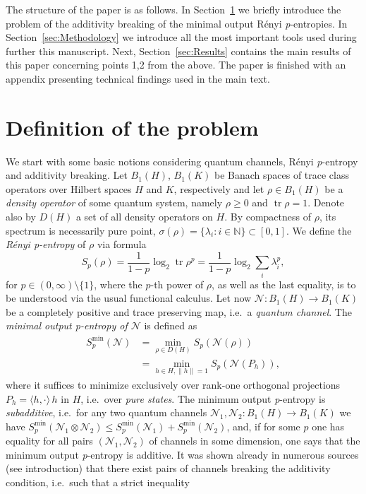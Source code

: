 \documentclass[reqno]{amsart}
\theoremstyle{plain}
\theoremstyle{note}
\newcommand{\naturals}{\mathbb{N}}
\newcommand\tr{\operatorname{tr}}
\newcommand{\proj}[1]{P_{#1}}
\newcommand{\iprod}[2]{\langle #1 , #2 \rangle}
\begin{document}
The structure of the paper is as follows. In Section~\ref{sec:DefOfProblem} we briefly introduce the problem of the additivity breaking of the minimal output R\'{e}nyi \textit{p}-entropies. In Section~\ref{sec:Methodology} we introduce all the most important tools used during further this manuscript. Next, Section~\ref{sec:Results} contains the main results of this paper concerning points 1,2 from the above. The paper is finished with an appendix presenting technical findings used in the main text.

\section{Definition of the problem}
\label{sec:DefOfProblem}

We start with some basic notions considering quantum channels, R\'{e}nyi \textit{p}-entropy and additivity breaking. Let $B_1 (H)$, $B_1 (K)$ be Banach spaces of trace class operators over Hilbert spaces $H$ and $K$, respectively and let $\rho \in B_1(H)$ be a \emph{density operator} of some quantum system, namely $\rho \geqslant 0$ and $\tr{\rho}=1$. Denote also by $D(H)$ a set of all density operators on $H$. By compactness of $\rho$, its spectrum is necessarily pure point, $\sigma (\rho) = \{\lambda_i : i\in \naturals\} \subset [0, 1]$. We define the \emph{R\'{e}nyi \textit{p}-entropy} of $\rho$ via formula
\begin{equation}\label{eq:RenyiEntropyDef}
    S_p (\rho) = \frac{1}{1-p} \log_2 {\tr{\rho^p}} = \frac{1}{1-p} \log_2 {\sum_i \lambda_{i}^{p}},
\end{equation}
for $p \in (0, \infty) \setminus \{1\}$, where the $p$-th power of $\rho$, as well as the last equality, is to be understood via the usual functional calculus. Let now $\mathcal{N} : B_1 (H)\to B_1 (K)$ be a completely positive and trace preserving map, i.e.~a \emph{quantum channel}. The \emph{minimal output \textit{p}-entropy of $\mathcal{N}$} is defined as
\begin{align}
    S^{\mathrm{min}}_{p}(\mathcal{N}) &= \min_{\rho \in D (H)}{S_{p}(\mathcal{N}(\rho))} \\
    &= \min_{h\in H, \| h \| = 1}{S_{p}(\mathcal{N}(\proj{h}))}, \nonumber
\end{align}
where it suffices to minimize exclusively over rank-one orthogonal projections $\proj{h} = \iprod{h}{\cdot} \, h$ in $H$, i.e.~over \emph{pure states}. The minimum output \textit{p}-entropy is \emph{subadditive}, i.e.~for any two quantum channels $\mathcal{N}_1 , \mathcal{N}_2 : B_1 (H) \to B_1 (K)$ we have $S_{p}^{\mathrm{min}}(\mathcal{N}_1 \otimes \mathcal{N}_2) \leqslant S_{p}^{\mathrm{min}}(\mathcal{N}_1) + S_{p}^{\mathrm{min}}(\mathcal{N}_2)$, and, if for some $p$ one has equality for all pairs $(\mathcal{N}_1, \mathcal{N}_2)$ of channels in some dimension, one says that the minimum output \textit{p}-entropy is additive. It was shown already in numerous sources (see introduction) that there exist pairs of channels breaking the additivity condition, i.e.~such that a strict inequality
\end{document}

